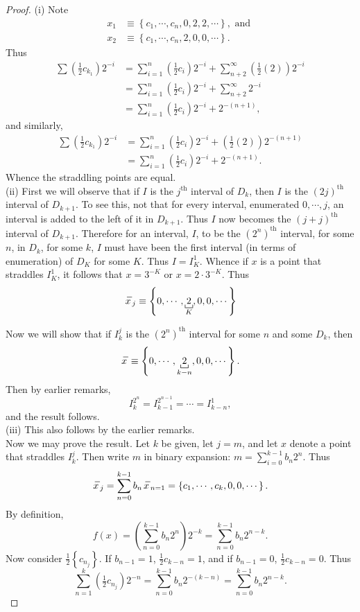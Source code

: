 \documentclass[12pt]{book}
\newcommand{\set}[1]{\left\{ #1 \right\}}
\newcommand{\tand}{\text{ and }}
\renewcommand{\.}{\mkern1mu}
\newcommand{\lr}[1]{\left(#1\right)}
\theoremstyle{theorem}
\renewcommand{\bar}[1]{\overset{\hspace{3pt}\rule[0.5pt]{\widthof{#1}}  
	{0.1ex}}{#1}}
\begin{document}
\begin{proof}
			(i) Note 
				\begin{align*}
				x_1 &\equiv \set{c_1,\cdots , c_n, 0, 2, 2, \cdots}, \tand\\
				x_2 &\equiv \set{c_1,\cdots, c_n, 2, 0, 0, \cdots}.
				\end{align*}
			Thus 
			\begin{align*}
			\sum \lr{\frac{1}{2}c_{k_1}}2^{-i} &= \sum_{i=1}^n \lr{\frac{1}{2}c_i}2^{-i} + \sum_{n+2}^\infty \lr{\frac{1}{2}(2)}2^{-i}\\
			&= \sum_{i=1}^n \lr{\frac{1}{2}c_i}2^{-i} + \sum_{n+2}^\infty2^{-i}\\
			&= \sum_{i=1}^n \lr{\frac{1}{2}c_i}2^{-i} + 2^{-(n+1)},
			\end{align*}		
			and similarly,
			\begin{align*}
			\sum \lr{\frac{1}{2}c_{k_1}}2^{-i} &= \sum_{i=1}^n \lr{\frac{1}{2}c_i}2^{-i} + \lr{\frac{1}{2}(2)}2^{-(n+1)}\\
			&= \sum_{i=1}^n \lr{\frac{1}{2}c_i}2^{-i} + 2^{-(n+1)}.
			\end{align*}
		Whence the straddling points are equal.\\
		
		(ii) First we will observe that if $I$ is the $j^{\text{th}}$ interval of $D_k$, then $I$ is the $(2j)^{\text{th}}$ interval of $D_{k+1}$. To see this, not that for every interval, enumerated $0,\cdots, j$, an interval is added to the left of it in $D_{k+1}$. Thus $I$ now becomes the $(j+j)^{\text{th}}$ interval of $D_{k+1}$. Therefore for an interval, $I$, to be the $(2^n)^{\text{th}}$ interval, for some $n$, in $D_k$, for some $k$, $I$ must have been the first interval (in terms of enumeration) of $D_K$ for some $K$. Thus $I = I^1_K$. Whence if $x$ is a point that straddles $I_K^1$, it follows that $x = {3^{-K}}$ or $x = 2\cdot{3^{-K}}$. Thus
		\[\bar{x}_j \equiv \set{0, \cdots, \underbracket[0.5pt]{\,2\,}_{K}, 0, 0, \cdots}\] 
		
		Now we will show that if $I_k^j$ is the $(2^n)^{\text{th}}$ interval for some $n$ and some $D_k$, then 
			\[\bar{x} \equiv \set{0, \cdots, \underbracket[0.5pt]{\,2\,}_{k-n}, 0, 0, \cdots}. \]
		Then by earlier remarks,
			\[ I^{2^n}_k = I^{2^{n-1}}_{k-1} = \cdots = I^1_{k-n},\]
		and the result follows.	\\
		
		(iii) This also follows by the earlier remarks.\\
							
		Now we may prove the result. Let $k$ be given, let $j=m$, and let $x$ denote a point that straddles $I_k^j$. Then write $m$ in binary expansion: $m = \sum_{i=0}^{k-1}b_n2^n.$ Thus
			\[ \bar{x}_j = \sum_{n=0}^{k-1}b_n\bar{x}_{n=1} = \set{c_1,\cdots, c_k, 0, 0,\cdots}. \]
		By definition, 
			\[ f(x) = \lr{\sum_{n=0}^{k-1}b_n2^n}2^{-k} = \sum_{n=0}^{k-1}b_n2^{n-k}.\]
		Now consider $\frac{1}{2}\set{c_{n_j}}$. If $b_{n-1} = 1$, $\frac{1}{2}c_{k-n} = 1$, and if $b_{n-1} = 0$, $\frac{1}{2}c_{k-n} = 0$. Thus
			\[\sum_{n=1}^k \lr{\tfrac{1}{2}c_{n_j}}2^{-n} = \sum_{n=0}^{k-1}b_n2^{-(k-n)} = \sum_{n=0}^{k-1}b_n2^{n-k}. \]
		\end{proof}
\end{document}
